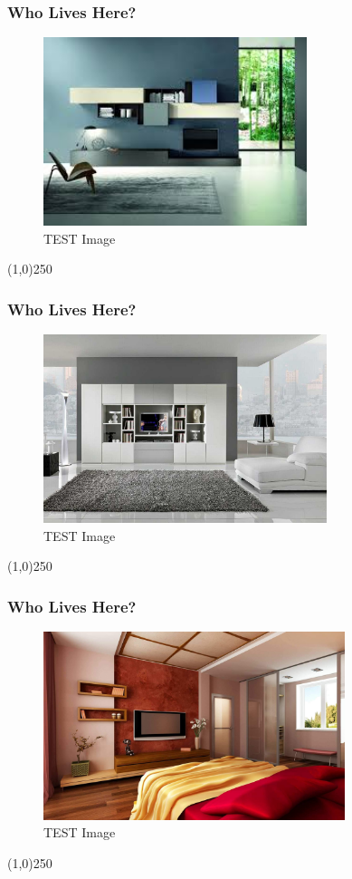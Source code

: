 \begin{frame}
\frametitle{Who Lives Here?}
\begin{figure}
	\centering
		\includegraphics[height=5.5cm]{img/C.jpg}
	\caption{TEST Image}
	\label{fig:SampleC}
\end{figure}
\end{frame}
\begin{center}\line(1,0){250}\end{center}



\begin{frame}
\frametitle{Who Lives Here?}
\begin{figure}
	\centering
		\includegraphics[height=5.5cm]{img/D.jpg}
	\caption{TEST Image}
	\label{fig:SampleD}
\end{figure}
\end{frame}
\begin{center}\line(1,0){250}\end{center}



\begin{frame}
\frametitle{Who Lives Here?}
\begin{figure}
	\centering
		\includegraphics[height=5.5cm]{img/E.jpg}
	\caption{TEST Image}
	\label{fig:SampleE}
\end{figure}
\end{frame}
\begin{center}\line(1,0){250}\end{center}





